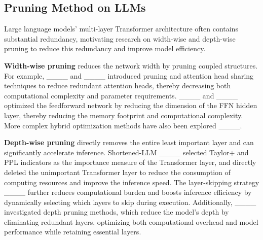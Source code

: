 \subsection{Pruning Method on LLMs}

Large language models' multi-layer Transformer architecture often contains substantial redundancy, motivating research on width-wise and depth-wise pruning to reduce this redundancy and improve model efficiency.

\textbf{Width-wise pruning} reduces the network width by pruning coupled structures. For example, ____ and ____ introduced pruning and attention head sharing techniques to reduce redundant attention heads, thereby decreasing both computational complexity and parameter requirements. ____ and ____ optimized the feedforward network by reducing the dimension of the FFN hidden layer, thereby reducing the memory footprint and computational complexity. More complex hybrid optimization methods have also been explored ____.

\textbf{Depth-wise pruning} directly removes the entire least important layer and can significantly accelerate inference. Shortened-LLM ____ selected Taylor+ and PPL indicators as the importance measure of the Transformer layer, and directly deleted the unimportant Transformer layer to reduce the consumption of computing resources and improve the inference speed. The layer-skipping strategy ____ further reduces computational burden and boosts inference efficiency by dynamically selecting which layers to skip during execution. Additionally, ____ investigated depth pruning methods, which reduce the model's depth by eliminating redundant layers, optimizing both computational overhead and model performance while retaining essential layers.